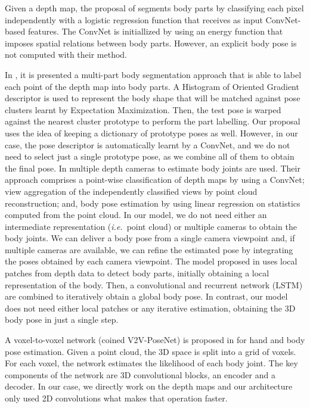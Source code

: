 \documentclass[review,12pt,3p]{elsarticle}
\def \ie{\textit{i.e.}}
\begin{document}
Given a depth map, the proposal of \citep{Jiu2014} segments body parts by classifying each pixel independently  with a logistic regression function that receives as input ConvNet-based features. The ConvNet is initiallized by using an energy function that imposes spatial relations between body parts. However, an explicit body pose is not computed with their method.

In \citep{Madadi2015}, it is presented a multi-part body segmentation approach that is able to label each point of the depth map into body parts. A Histogram of Oriented Gradient descriptor is used to represent the body shape that will be matched against pose clusters learnt by Expectation Maximization. Then, the test pose is warped against the nearest cluster prototype to perform the part labelling.
Our proposal uses the idea of keeping a dictionary of prototype poses as well. However, in our case, the pose descriptor is automatically learnt by a ConvNet, and we do not need to select just a single prototype pose, as we combine all of them to obtain the final pose.
In \citep{Shafaei16} multiple depth cameras to estimate body joints are used. Their approach comprises a point-wise classification of depth maps by using a ConvNet; view aggregation of the independently classified views by point cloud reconstruction; and, body pose estimation by using linear regression on statistics computed from the point cloud.
In our model, we do not need either an intermediate representation (\ie~point cloud) or multiple cameras to obtain the body joints. We can deliver a body pose from a single camera viewpoint and, if multiple cameras are available, we can refine the estimated pose by integrating the poses obtained by each camera viewpoint.
The model proposed in \cite{haque2016eccv} uses local patches from depth data to detect body parts, initially obtaining a local representation of the body. Then, a convolutional and recurrent network (LSTM) are combined to iteratively obtain a global body pose.
In contrast, our model does not need either local patches or any iterative estimation, obtaining the 3D body pose in just a single step.

A voxel-to-voxel network (coined V2V-PoseNet) is proposed in \cite{moon2018cvpr} for hand and body pose estimation. Given a point cloud, the 3D space is split into a grid of voxels. For each voxel, the network estimates the likelihood of each body joint. The key components of the network are 3D convolutional blocks, an encoder and a decoder. In our case, we directly work on the depth maps and our architecture only used 2D convolutions what makes that operation faster.
\end{document}
